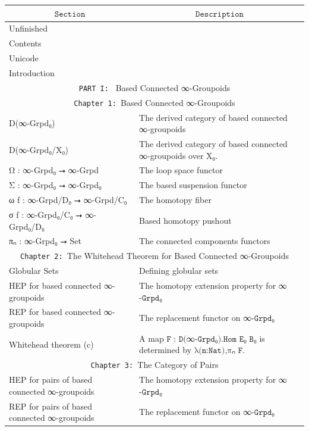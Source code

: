 \documentclass{book}
\theoremstyle{definition}
\begin{document}
{
\footnotesize
\begin{longtable}{|| l || l ||} 
\hline
\multicolumn{1}{||c||}{$\texttt{Section}$} & \multicolumn{1}{|c||}{$\texttt{Description}$} \\
\hline
\hline
Unfinished & \\
\hline
Contents & \\
\hline
Unicode & \\
\hline
Introduction & \\
\hline \hline
\multicolumn{2}{||c||}{\texttt{PART I: } Based Connected ∞-Groupoids} \\
\hline \hline
\multicolumn{2}{||c||}{\texttt{Chapter 1: }Based Connected ∞-Groupoids} \\
\hline \hline
D(∞-Grpd₀) & The derived category of based connected ∞-groupoids \\
\hline
D(∞-Grpd₀/X₀) & The derived category of based connected ∞-groupoids over X₀. \\
\hline
Ω : ∞-Grpd₀ ⭢ ∞-Grpd & The loop space functor \\
\hline
Σ : ∞-Grpd₀ ⭢ ∞-Grpd₀ & The based suspension functor \\
\hline 
ω f : ∞-Grpd/D₀ ⭢ ∞-Grpd/C₀ & The homotopy fiber\\
\hline 
σ f : ∞-Grpd₀/C₀ ⭢ ∞-Grpd₀/D₀ & Based homotopy pushout \\
 \hline 
πₙ : ∞-Grpd₀ ⭢ Set & The connected components functors\\
 \hline \hline
  \multicolumn{2}{||c||}{\texttt{Chapter 2: }The Whitehead Theorem for Based Connected ∞-Groupoids} \\
\hline \hline
Globular Sets & Defining globular sets\\
\hline
HEP for based connected ∞-groupoids & The homotopy extension property for ∞$\texttt{-Grpd}$₀\\
 \hline 
REP for based connected ∞-groupoids & The replacement functor on ∞$\texttt{-Grpd}$₀ \\
\hline
Whitehead theorem (c) & A map $\texttt{F : D(}$∞$\texttt{-Grpd₀).Hom E₀ B₀}$ is determined by $\texttt{λ(n:Nat),πₙ F}$. \\
\hline \hline
  \multicolumn{2}{||c||}{\texttt{Chapter 3: }The Category of Pairs} \\
\hline \hline
HEP for pairs of based connected ∞-groupoids & The homotopy extension property for ∞$\texttt{-Grpd}$₀\\
 \hline 
REP for pairs of based connected ∞-groupoids & The replacement functor on ∞$\texttt{-Grpd}$₀ \\

\end{longtable}}
\end{document}
